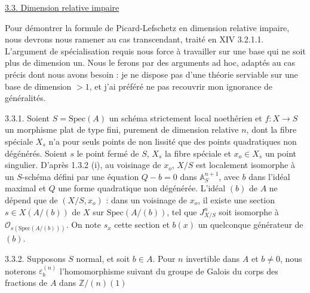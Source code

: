 \underline{3.3. Dimension relative impaire}

Pour démontrer la formule de Picard-Lefschetz en dimension relative impaire, nous devrons nous ramener au cas transcendant, traité en XIV 3.2.1.1. L'argument de spécialisation requis nous force à travailler sur une base qui ne soit plus de dimension un. Nous le ferons par des arguments ad hoc, adaptés au cas précis dont nous avons besoin : je ne dispose pas d'une théorie serviable sur une base de dimension $>1$, et j'ai préféré ne pas recouvrir mon ignorance de généralités.

3.3.1. Soient $S=\mathrm{Spec}(A)$ un schéma strictement local noethérien et $f:X\to S$ un morphisme plat de type fini, purement de dimension relative $n$, dont la fibre spéciale $X_s$ n'a pour seuls points de non lissité que des points quadratiques non dégénérés. Soient $s$ le point fermé de $S$, $X_s$ la fibre spéciale et $x_o\in X_s$ un point singulier. D'après 1.3.2 (i), au voisinage de $x_o$, $X/S$ est localement isomorphe à un $S$-schéma défini par une équation $Q-b=0$ dans $\mathbb{A}^{n+1}_S$, avec $b$ dans l'idéal maximal et $Q$ une forme quadratique non dégénérée. L'idéal $(b)$ de $A$ ne dépend que de $(X/S,x_o)$ : dans un voisinage de $x_o$, il existe une section $s\in X(A/(b))$ de $X$ sur $\mathrm{Spec}(A/(b))$, tel que $J^n_{X/S}$ soit isomorphe à $\mathcal{O}_{s(\mathrm{Spec}(A/(b)))}$. On note $s_x$ cette section et $b(x)$ un quelconque générateur de $(b)$.



%
%
3.3.2. Supposons $S$ normal, et soit $b\in A$. Pour $n$ invertible dans $A$ et $b\neq 0$, nous noterons $\varepsilon_b^{(n)}$ l'homomorphisme suivant du groupe de Galois du corps des fractions de $A$ dans $\mathbb{Z}/(n)(1)$

